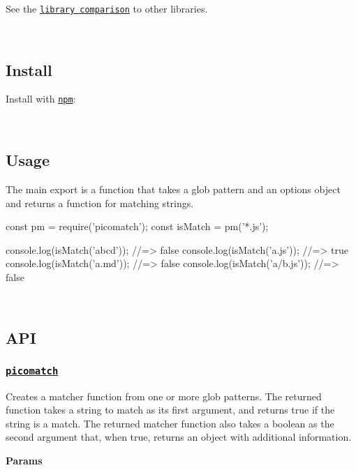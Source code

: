 See the \href{#library-comparisons}{\tt library comparison} to other libraries.

~\newline
 ~\newline


\subsection*{Install}

Install with \href{https://www.npmjs.com/}{\tt npm}\+:




~\newline


\subsection*{Usage}

The main export is a function that takes a glob pattern and an options object and returns a function for matching strings.


\begin{DoxyCode}
const pm = require('picomatch');
const isMatch = pm('*.js');

console.log(isMatch('abcd')); //=> false
console.log(isMatch('a.js')); //=> true
console.log(isMatch('a.md')); //=> false
console.log(isMatch('a/b.js')); //=> false
\end{DoxyCode}


~\newline


\subsection*{A\+PI}

\subsubsection*{\href{lib/picomatch.js#L30}{\tt picomatch}}

Creates a matcher function from one or more glob patterns. The returned function takes a string to match as its first argument, and returns true if the string is a match. The returned matcher function also takes a boolean as the second argument that, when true, returns an object with additional information.

{\bfseries Params}



